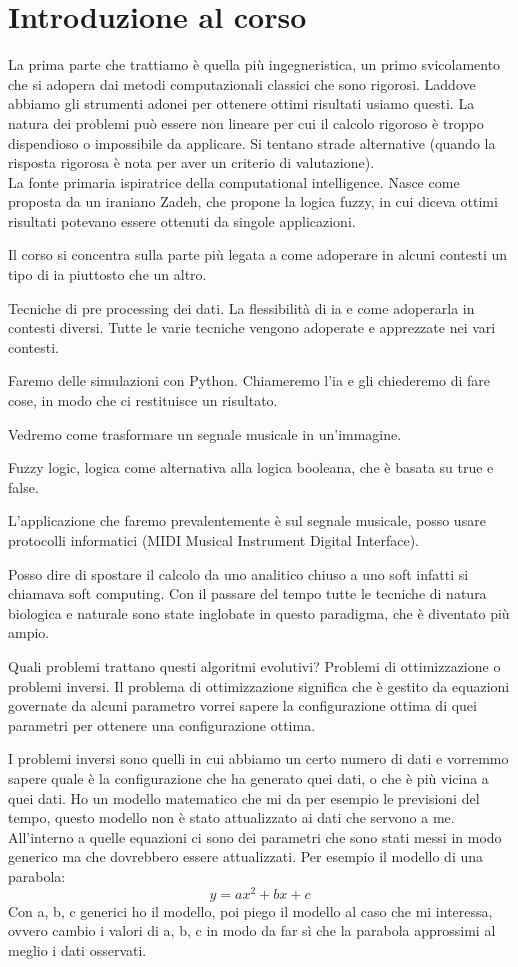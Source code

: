 \section{Introduzione al corso}
La prima parte che trattiamo è quella più ingegneristica, un primo svicolamento che 
si adopera dai metodi computazionali classici che sono rigorosi.
Laddove abbiamo gli strumenti adonei per ottenere ottimi risultati usiamo questi.
La natura dei problemi può essere non lineare per cui il calcolo rigoroso è troppo 
dispendioso o impossibile da applicare. Si tentano strade alternative (quando 
la risposta rigorosa è nota per aver un criterio di valutazione).\\

La fonte primaria ispiratrice della computational intelligence. Nasce come proposta
da un iraniano Zadeh, che propone la logica fuzzy, in cui diceva ottimi risultati potevano
essere ottenuti da singole applicazioni.

Il corso si concentra sulla parte più legata a come adoperare in alcuni contesti un 
tipo di ia piuttosto che un altro.

Tecniche di pre processing dei dati.
La flessibilità di ia e come adoperarla in contesti diversi.
Tutte le varie tecniche vengono adoperate e apprezzate nei vari contesti.

Faremo delle simulazioni con Python. Chiameremo l'ia e gli chiederemo di fare cose, 
in modo che ci restituisce un risultato.

Vedremo come trasformare un segnale musicale in un'immagine.

Fuzzy logic, logica come alternativa alla logica booleana, che è basata su true e false.

L'applicazione che faremo prevalentemente è sul segnale musicale, posso usare protocolli 
informatici (MIDI Musical Instrument Digital Interface).

Posso dire di spostare il calcolo da uno analitico chiuso a uno soft
infatti si chiamava soft computing.
Con il passare del tempo tutte le tecniche di natura biologica e naturale sono state
inglobate in questo paradigma, che è diventato più ampio.

Quali problemi trattano questi algoritmi evolutivi? Problemi di ottimizzazione o 
problemi inversi.
Il problema di ottimizzazione significa che è gestito da equazioni governate da alcuni parametro
vorrei sapere la configurazione ottima di quei parametri per ottenere una configurazione ottima.

I problemi inversi sono quelli in cui abbiamo un certo numero di dati e vorremmo 
sapere quale è la configurazione che ha generato quei dati, o che è più vicina 
a quei dati.
Ho un modello matematico che mi da per esempio le previsioni del tempo, questo modello
non è stato attualizzato ai dati che servono a me. All'interno a quelle equazioni
ci sono dei parametri che sono stati messi in modo generico ma che dovrebbero 
essere attualizzati.
Per esempio il modello di una parabola:
$$y=ax^2+bx+c$$
Con a, b, c generici ho il modello, poi piego il modello al caso che mi interessa, 
ovvero cambio i valori di a, b, c in modo da far sì che la parabola approssimi al meglio i dati osservati.


